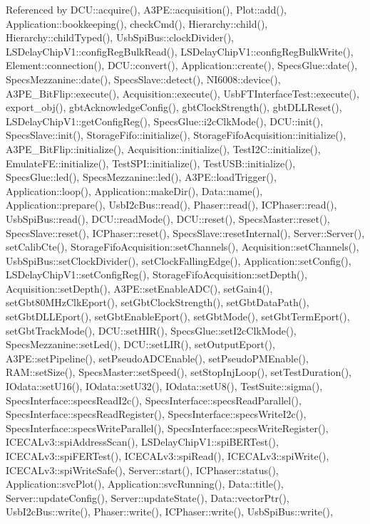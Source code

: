 Referenced by D\+C\+U\+::acquire(), A3\+P\+E\+::acquisition(), Plot\+::add(), Application\+::bookkeeping(), check\+Cmd(), Hierarchy\+::child(), Hierarchy\+::child\+Typed(), Usb\+Spi\+Bus\+::clock\+Divider(), L\+S\+Delay\+Chip\+V1\+::config\+Reg\+Bulk\+Read(), L\+S\+Delay\+Chip\+V1\+::config\+Reg\+Bulk\+Write(), Element\+::connection(), D\+C\+U\+::convert(), Application\+::create(), Specs\+Glue\+::date(), Specs\+Mezzanine\+::date(), Specs\+Slave\+::detect(), N\+I6008\+::device(), A3\+P\+E\+\_\+\+Bit\+Flip\+::execute(), Acquisition\+::execute(), Usb\+F\+T\+Interface\+Test\+::execute(), export\+\_\+obj(), gbt\+Acknowledge\+Config(), gbt\+Clock\+Strength(), gbt\+D\+L\+L\+Reset(), L\+S\+Delay\+Chip\+V1\+::get\+Config\+Reg(), Specs\+Glue\+::i2c\+Clk\+Mode(), D\+C\+U\+::init(), Specs\+Slave\+::init(), Storage\+Fifo\+::initialize(), Storage\+Fifo\+Acquisition\+::initialize(), A3\+P\+E\+\_\+\+Bit\+Flip\+::initialize(), Acquisition\+::initialize(), Test\+I2\+C\+::initialize(), Emulate\+F\+E\+::initialize(), Test\+S\+P\+I\+::initialize(), Test\+U\+S\+B\+::initialize(), Specs\+Glue\+::led(), Specs\+Mezzanine\+::led(), A3\+P\+E\+::load\+Trigger(), Application\+::loop(), Application\+::make\+Dir(), Data\+::name(), Application\+::prepare(), Usb\+I2c\+Bus\+::read(), Phaser\+::read(), I\+C\+Phaser\+::read(), Usb\+Spi\+Bus\+::read(), D\+C\+U\+::read\+Mode(), D\+C\+U\+::reset(), Specs\+Master\+::reset(), Specs\+Slave\+::reset(), I\+C\+Phaser\+::reset(), Specs\+Slave\+::reset\+Internal(), Server\+::\+Server(), set\+Calib\+Cte(), Storage\+Fifo\+Acquisition\+::set\+Channels(), Acquisition\+::set\+Channels(), Usb\+Spi\+Bus\+::set\+Clock\+Divider(), set\+Clock\+Falling\+Edge(), Application\+::set\+Config(), L\+S\+Delay\+Chip\+V1\+::set\+Config\+Reg(), Storage\+Fifo\+Acquisition\+::set\+Depth(), Acquisition\+::set\+Depth(), A3\+P\+E\+::set\+Enable\+A\+D\+C(), set\+Gain4(), set\+Gbt80\+M\+Hz\+Clk\+Eport(), set\+Gbt\+Clock\+Strength(), set\+Gbt\+Data\+Path(), set\+Gbt\+D\+L\+L\+Eport(), set\+Gbt\+Enable\+Eport(), set\+Gbt\+Mode(), set\+Gbt\+Term\+Eport(), set\+Gbt\+Track\+Mode(), D\+C\+U\+::set\+H\+I\+R(), Specs\+Glue\+::set\+I2c\+Clk\+Mode(), Specs\+Mezzanine\+::set\+Led(), D\+C\+U\+::set\+L\+I\+R(), set\+Output\+Eport(), A3\+P\+E\+::set\+Pipeline(), set\+Pseudo\+A\+D\+C\+Enable(), set\+Pseudo\+P\+M\+Enable(), R\+A\+M\+::set\+Size(), Specs\+Master\+::set\+Speed(), set\+Stop\+Inj\+Loop(), set\+Test\+Duration(), I\+Odata\+::set\+U16(), I\+Odata\+::set\+U32(), I\+Odata\+::set\+U8(), Test\+Suite\+::sigma(), Specs\+Interface\+::specs\+Read\+I2c(), Specs\+Interface\+::specs\+Read\+Parallel(), Specs\+Interface\+::specs\+Read\+Register(), Specs\+Interface\+::specs\+Write\+I2c(), Specs\+Interface\+::specs\+Write\+Parallel(), Specs\+Interface\+::specs\+Write\+Register(), I\+C\+E\+C\+A\+Lv3\+::spi\+Address\+Scan(), L\+S\+Delay\+Chip\+V1\+::spi\+B\+E\+R\+Test(), I\+C\+E\+C\+A\+Lv3\+::spi\+F\+E\+R\+Test(), I\+C\+E\+C\+A\+Lv3\+::spi\+Read(), I\+C\+E\+C\+A\+Lv3\+::spi\+Write(), I\+C\+E\+C\+A\+Lv3\+::spi\+Write\+Safe(), Server\+::start(), I\+C\+Phaser\+::status(), Application\+::svc\+Plot(), Application\+::svc\+Running(), Data\+::title(), Server\+::update\+Config(), Server\+::update\+State(), Data\+::vector\+Ptr(), Usb\+I2c\+Bus\+::write(), Phaser\+::write(), I\+C\+Phaser\+::write(), Usb\+Spi\+Bus\+::write(), 